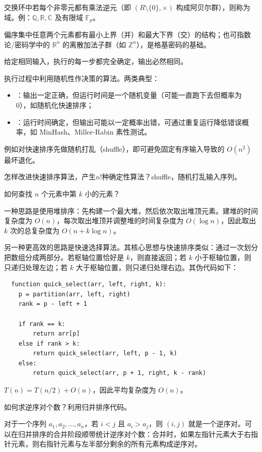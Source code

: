 \documentclass[12pt]{article}
\begin{document}
\begin{defn}[域（field）]
  交换环中若每个非零元都有乘法逆元（即 $(R\setminus\{0\},\times)$ 构成阿贝尔群），则称为域。例：$\mathbb{Q},\mathbb{R},\mathbb{C}$ 及有限域 $\mathbb{F}_p$。
\end{defn}

\begin{defn}[格（lattice）]
  偏序集中任意两个元素都有最小上界（并）和最大下界（交）的结构；也可指数论/密码学中的 $\mathbb{R}^n$ 的离散加法子群（如 $\mathbb{Z}^n$），是格基密码的基础。
\end{defn}
\begin{defn}[确定性算法]
  给定相同输入，执行的每一步都完全确定，输出必然相同。
\end{defn}

\begin{defn}
  执行过程中利用随机性作决策的算法。两类典型：
  \begin{itemize}
    \item {}：输出一定正确，但运行时间是一个随机变量（可能一直跑下去但概率为 0），如随机化快速排序；
    \item {}：运行时间确定，但输出可能以一定概率出错，可通过重复运行降低错误概率，如 MinHash、Miller-Rabin 素性测试。
  \end{itemize}
  例如对快速排序先做随机打乱（shuffle），即可避免固定有序输入导致的 $O(n^2)$ 最坏退化。
\end{defn}
\begin{note}
  怎样改进快速排序算法，产生$n!$种确定性算法？shuffle，随机打乱输入序列。
\end{note}
\begin{note}
  如何查找 $n$ 个元素中第 $k$ 小的元素？

  一种思路是使用堆排序：先构建一个最大堆，然后依次取出堆顶元素。建堆的时间复杂度为 $O(n)$，每次取出堆顶并调整堆的时间复杂度为 $O(\log n)$，因此取出 $k$ 次的总复杂度为 $O(n+k\log n)$。

  另一种更高效的思路是快速选择算法。其核心思想与快速排序类似：通过一次划分把数组分成两部分。若枢轴位置恰好是 $k$，则直接返回；若 $k$ 小于枢轴位置，则只递归处理左边；若 $k$ 大于枢轴位置，则只递归处理右边。其伪代码如下：
  \begin{verbatim}
  function quick_select(arr, left, right, k):
    p = partition(arr, left, right)
    rank = p - left + 1

    if rank == k:
        return arr[p]
    else if rank > k:
        return quick_select(arr, left, p - 1, k)
    else:
        return quick_select(arr, p + 1, right, k - rank)
  \end{verbatim}
  $T(n)=T(n/2)+O(n)$，因此平均复杂度为 $O(n)$。
\end{note}
\begin{exam}
  如何求逆序对个数？利用归并排序代码。

  对于一个序列 $a_1,a_2,\dots,a_n$，若 $i<j$ 且 $a_i>a_j$，则 $(i,j)$ 就是一个逆序对。可以在归并排序的合并阶段顺带统计逆序对个数：合并时，如果左指针元素大于右指针元素，则右指针元素与左半部分剩余的所有元素构成逆序对。

\end{exam}
\end{document}
